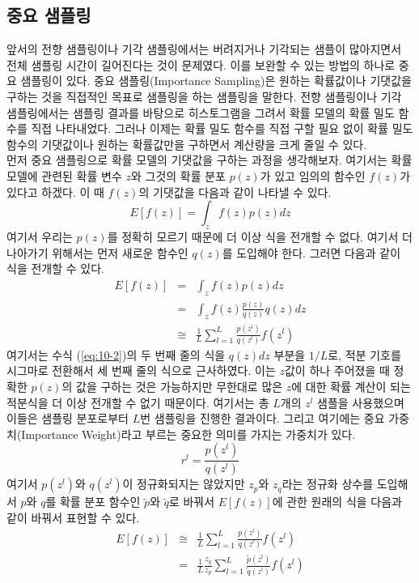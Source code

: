 \documentclass[a4paper]{oblivoir}
\begin{document}
\subsection{중요 샘플링}

앞서의 전향 샘플링이나 기각 샘플링에서는 버려지거나 기각되는 샘플이 많아지면서 전체 샘플링 시간이 길어진다는 것이 문제였다. 이를 보완할 수 있는 방법의 하나로 중요 샘플링이 있다. 중요 샘플링(Importance Sampling)은 원하는 확률값이나 기댓값을 구하는 것을 직접적인 목표로 샘플링을 하는 샘플링을 말한다. 전향 샘플링이나 기각 샘플링에서는 샘플링 결과를 바탕으로 히스토그램을 그려서 확률 모델의 확률 밀도 함수를 직접 나타내었다. 그러나 이제는 확률 밀도 함수를 직접 구할 필요 없이 확률 밀도 함수의 기댓값이나 원하는 확률값만을 구하면서 계산량을 크게 줄일 수 있다. \\

먼저 중요 샘플링으로 확률 모델의 기댓값을 구하는 과정을 생각해보자. 여기서는 확률 모델에 관련된 확률 변수 $z$와 그것의 확률 분포 $p(z)$가 있고 임의의 함수인 $f(z)$가 있다고 하겠다. 이 때 $f(z)$의 기댓값을 다음과 같이 나타낼 수 있다.
\begin{equation}
E[f(z)] = \int_{z} f(z)p(z)dz
\label{eq:10-1}
\end{equation} 
여기서 우리는 $p(z)$를 정확히 모르기 때문에 더 이상 식을 전개할 수 없다. 여기서 더 나아가기 위해서는 먼저 새로운 함수인 $q(z)$를 도입해야 한다. 그러면 다음과 같이 식을 전개할 수 있다.
\begin{eqnarray}
E[f(z)] & = & \int_{z} f(z)p(z)dz \nonumber \\
& = & \int_{z} f(z) \frac{p(z)}{q(z)} q(z) dz \nonumber \\
& \cong & \frac{1}{L} \sum_{l=1}^{L} \frac{p(z^{l})}{q(z^{l})}f(z^{l}) \label{eq:10-2}
\end{eqnarray} 
여기서는 수식 (\ref{eq:10-2})의 두 번째 줄의 식을 $q(z)dz$ 부분을 $1/L$로, 적분 기호를 시그마로 전환해서 세 번째 줄의 식으로 근사하였다. 이는 $z$값이 하나 주어졌을 때 정확한 $p(z)$의 값을 구하는 것은 가능하지만 무한대로 많은 $z$에 대한 확률 계산이 되는 적분식을 더 이상 전개할 수 없기 때문이다. 여기서는 총 $L$개의 $z^{l}$ 샘플을 사용했으며 이들은 샘플링 분포로부터 $L$번 샘플링을 진행한 결과이다. 그리고 여기에는 중요 가중치(Importance Weight)라고 부르는 중요한 의미를 가지는 가중치가 있다. 
\begin{equation}
r^{l} = \frac{p(z^{l})}{q(z^{l})}
\label{eq:10-2-1} 
\end{equation} 
여기서 $p(z^{l})$와 $q(z^{l})$이 정규화되지는 않았지만 $z_{p}$와 $z_{q}$라는 정규화 상수를 도입해서 $p$와 $q$를 확률 분포 함수인 $\tilde{p}$와 $\tilde{q}$로 바꿔서 $E[f(z)]$에 관한 원래의 식을 다음과 같이 바꿔서 표현할 수 있다. 
\begin{eqnarray}
E[f(z)] & \cong & \frac{1}{L} \sum_{l=1}^{L} \frac{p(z^{l})}{q(z^{l})}f(z^{l}) \nonumber \\
& = &  \frac{1}{L} \frac{z_{q}}{z_{p}} \sum_{l=1}^{L} \frac{\tilde{p}(z^{l})}{\tilde{q}(z^{l})}f(z^{l}) \label{eq:10-2-2}
\end{eqnarray} 
\end{document}
